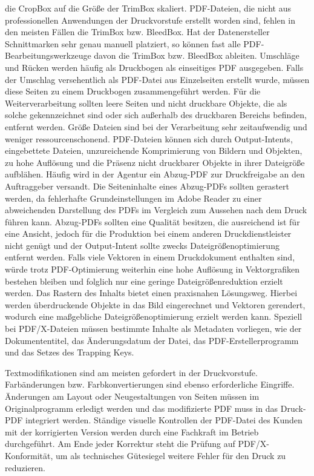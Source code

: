 die CropBox auf die Größe der TrimBox skaliert. PDF-Dateien, die nicht aus professionellen Anwendungen der Druckvorstufe erstellt worden sind, fehlen in den meisten Fällen die TrimBox bzw. BleedBox. Hat der Datenersteller Schnittmarken sehr genau manuell platziert, so können fast alle PDF-Bearbeitungswerkzeuge davon die TrimBox bzw. BleedBox ableiten. Umschläge und Rücken werden häufig als Druckbogen als einseitiges PDF ausgegeben. Falls der Umschlag versehentlich als PDF-Datei aus Einzelseiten erstellt wurde, müssen diese Seiten zu einem Druckbogen zusammengeführt werden. Für die Weiterverarbeitung sollten leere Seiten und nicht druckbare Objekte, die als solche gekennzeichnet sind oder sich außerhalb des druckbaren Bereichs befinden, entfernt werden. Größe Dateien sind bei der Verarbeitung sehr zeitaufwendig und weniger ressourcenschonend. PDF-Dateien können sich durch Output-Intents, eingebettete Dateien, unzureichende Komprimierung von Bildern und Objekten, zu hohe Auflösung und die Präsenz nicht druckbarer Objekte in ihrer Dateigröße aufblähen. Häufig wird in der Agentur ein Abzug-PDF zur Druckfreigabe an den Auftraggeber versandt. Die Seiteninhalte eines Abzug-PDFs sollten gerastert werden, da fehlerhafte Grundeinstellungen im Adobe Reader zu einer abweichenden Darstellung des PDFs im Vergleich zum Aussehen nach dem Druck führen kann. Abzug-PDFs sollten eine Qualität besitzen, die ausreichend ist für eine Ansicht, jedoch für die Produktion bei einem anderen Druckdienstleister nicht genügt und der Output-Intent sollte zwecks Dateigrößenoptimierung entfernt werden. Falls viele Vektoren in einem Druckdokument enthalten sind, würde trotz PDF-Optimierung weiterhin eine hohe Auflösung in Vektorgrafiken bestehen bleiben und folglich nur eine geringe Dateigrößenreduktion erzielt werden. Das Rastern des Inhalts bietet einen praxisnahen Lösungsweg. Hierbei werden überdruckende Objekte in das Bild eingerechnet und Vektoren gerendert, wodurch eine maßgebliche Dateigrößenoptimierung erzielt werden kann. Speziell bei PDF/X-Dateien müssen bestimmte Inhalte als Metadaten vorliegen, wie der Dokumententitel, das Änderungsdatum der Datei, das PDF-Erstellerprogramm und das Setzes des Trapping Keys. 
\cite{schneeberger}

Textmodifikationen sind am meisten gefordert in der Druckvorstufe. Farbänderungen bzw. Farbkonvertierungen sind ebenso erforderliche Eingriffe. Änderungen am Layout oder Neugestaltungen von Seiten müssen im Originalprogramm erledigt werden und das modifizierte PDF muss in das Druck-PDF integriert werden. Ständige visuelle Kontrollen der PDF-Datei des Kunden mit der korrigierten Version werden durch eine Fachkraft im Betrieb durchgeführt. Am Ende jeder Korrektur steht die Prüfung auf PDF/X-Konformität, um als technisches Gütesiegel weitere Fehler für den Druck zu reduzieren. \cite{schneeberger}

